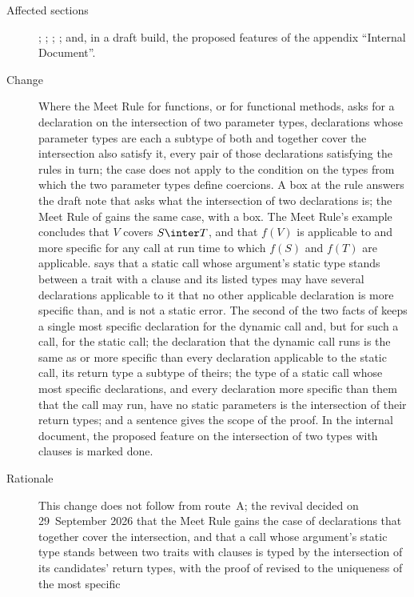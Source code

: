 \begin{description}
\item[Affected sections] ;
; ;
; and, in a draft build, the proposed
features of the appendix ``Internal Document''.
\item[Change] Where the Meet Rule for functions, or for functional methods,
asks for a declaration on the intersection of two parameter types, declarations
whose parameter types are each a subtype of both and together cover the
intersection also satisfy it, every pair of those declarations satisfying the
rules in turn; the case does not apply to the condition on the types from which
the two parameter types define coercions.
A box at the rule answers the draft note that asks what the intersection of two
declarations is; the Meet Rule of  gains the
same case, with a box.
The Meet Rule's example concludes that $V$ covers $S \inter T$, and that $f(V)$
is applicable to and more specific for any call at run time to which $f(S)$ and
$f(T)$ are applicable.
 says that a static call whose argument's static
type stands between a trait with a  clause and its listed types
may have several declarations applicable to it that no other applicable
declaration is more specific than, and is not a static error.
The second of the two facts of  keeps a
single most specific declaration for the dynamic call and, but for such a call,
for the static call; the declaration that the dynamic call runs is the same as
or more specific than every declaration applicable to the static call, its
return type a subtype of theirs; the type of a static call whose most specific
declarations, and every declaration more specific than them that the call may
run, have no static parameters is the intersection of their return types; and a sentence gives the scope of the proof.
In the internal document, the proposed feature on the intersection of two types
with  clauses is marked done.
\item[Rationale] This change does not follow from route~A; the revival decided
on 29~September 2026 that the Meet Rule gains the case of declarations that
together cover the intersection, and that a call whose argument's static type
stands between two traits with  clauses is typed by the
intersection of its candidates' return types, with the proof of
 revised to the uniqueness of the most specific

\end{description}
